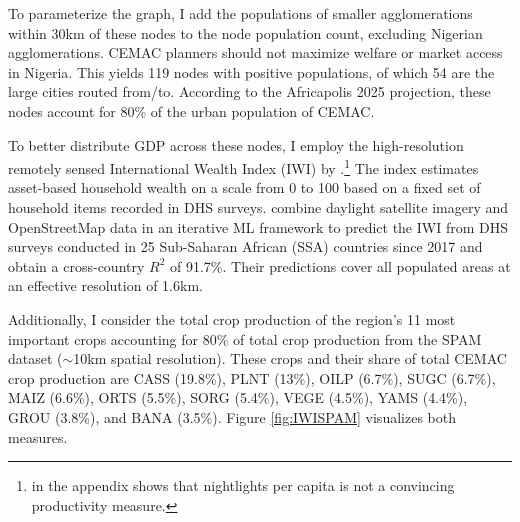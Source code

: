 \documentclass[a4paper]{article}
\begin{document}
To parameterize the graph, I add the populations of smaller agglomerations within 30km of these nodes to the node population count, excluding Nigerian agglomerations. CEMAC planners should not maximize welfare or market access in Nigeria. This yields 119 nodes with positive populations, of which 54 are the large cities routed from/to. According to the Africapolis 2025 projection, these nodes account for 80\% of the urban population of CEMAC.  \newline %

  To better distribute GDP across these nodes, I employ the high-resolution remotely sensed International Wealth Index (IWI) by \citet{lee2022high}.\footnote{\citet{krantz2024optimal} in the appendix shows that nightlights per capita is not a convincing productivity measure.} The index estimates asset-based household wealth on a scale from 0 to 100 based on a fixed set of household items recorded in DHS surveys. \citet{lee2022high} combine daylight satellite imagery and OpenStreetMap data in an iterative ML framework to predict the IWI from DHS surveys conducted in 25 Sub-Saharan African (SSA) countries since 2017 and obtain a cross-country $R^2$ of 91.7\%. Their predictions cover all populated areas at an effective resolution of 1.6km. \newline 
  
Additionally, I consider the total crop production of the region's 11 most important crops accounting for 80\% of total crop production from the SPAM dataset \citep{SPAM} ($\sim$10km spatial resolution). These crops and their share of total CEMAC crop production are CASS (19.8\%), PLNT (13\%), OILP (6.7\%), SUGC (6.7\%), MAIZ (6.6\%), ORTS (5.5\%), SORG (5.4\%), VEGE (4.5\%), YAMS (4.4\%), GROU (3.8\%), and BANA (3.5\%). Figure \ref{fig:IWISPAM} visualizes both measures. 
\end{document}
